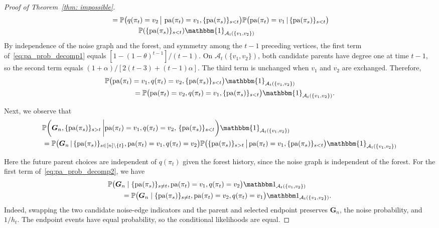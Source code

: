 \documentclass[twoside,11pt]{article}
\theoremstyle{remark}
\begin{document}
\begin{proof}[Proof of Theorem~\ref{thm: impossible}]
\begin{align}
&= \mathbb{P}\bigl( q(\pi_t) = v_2 \,\big|\, \operatorname{pa}(\pi_t) = v_1,  \{ \operatorname{pa}(\pi_s) \}_{s < t} \bigr) 
\mathbb{P}\bigl( \operatorname{pa}(\pi_t) = v_1 \,|\, \{ \operatorname{pa}(\pi_s) \}_{s < t} \bigr) \nonumber \\
&\qquad \qquad \mathbb{P}( \{\operatorname{pa}(\pi_s) \}_{s < t} ) \mathbbm{1}_{\mathcal{A}_t(\{v_1, v_2\})}\label{eq:pa_prob_decomp1}
\end{align}
By independence of the noise graph and the forest, and symmetry among the $t-1$ preceding vertices, the first term of~\eqref{eq:pa_prob_decomp1} equals $[1-(1-\theta)^{t-1}]/(t-1)$.
On $\mathcal A_t(\{v_1,v_2\})$, both candidate parents have degree one at time $t-1$, so the second term equals $(1+\alpha)/[2(t-3)+(t-1)\alpha]$.
The third term is unchanged when $v_1$ and $v_2$ are exchanged. Therefore,
\begin{align*}
&\mathbb{P}\bigl( \operatorname{pa}(\pi_t) = v_1, q(\pi_t) = v_2, \{ \operatorname{pa}(\pi_s) \}_{s < t} \bigr) \mathbbm{1}_{\mathcal{A}_t(\{v_1, v_2\})} \\
&\qquad \qquad =  
\mathbb{P}\bigl( \operatorname{pa}(\pi_t) = v_2, q(\pi_t) = v_1, \{ \operatorname{pa}(\pi_s) \}_{s < t} \bigr) \mathbbm{1}_{\mathcal{A}_t(\{v_1, v_2\})}.
\end{align*}

Next, we observe that 
\begingroup
\begin{align}
& \mathbb{P}\biggl(\bm{G}_n, \{\text{pa}(\pi_s)\}_{s>t} \,\bigg| \text{pa}(\pi_t) = v_1, q(\pi_t)=v_2,\, \{\text{pa}(\pi_s)\}_{s<t}\biggr)\mathbbm{1}_{\mathcal{A}_t(\{v_1, v_2\})} \nonumber \\
%
& = \mathbb{P}\bigl( \bm{G}_n \,|\, \{\operatorname{pa}(\pi_s)\}_{s \in [n] \backslash \{t\}}, \operatorname{pa}(\pi_t) = v_1, q(\pi_t)=v_2 \bigr) \mathbb{P}\bigl( \{\text{pa}(\pi_s)\}_{s>t} \,\big|\, \text{pa}(\pi_t) = v_1, \{\text{pa}(\pi_s)\}_{s<t}\bigr)\mathbbm{1}_{\mathcal{A}_t(\{v_1, v_2\})}
\label{eq:pa_prob_decomp2}
\end{align}
\endgroup


Here the future parent choices are independent of $q(\pi_t)$ given the forest history, since the noise graph is independent of the forest.
For the first term of~\eqref{eq:pa_prob_decomp2}, we have
%
\begin{equation*}
\begin{aligned}
&\mathbb P\bigl(\bm G_n\mid\{\operatorname{pa}(\pi_s)\}_{s\neq t},\operatorname{pa}(\pi_t)=v_1,q(\pi_t)=v_2\bigr)
\mathbbm1_{\mathcal A_t(\{v_1,v_2\})}\\
&\qquad=\mathbb P\bigl(\bm G_n\mid\{\operatorname{pa}(\pi_s)\}_{s\neq t},\operatorname{pa}(\pi_t)=v_2,q(\pi_t)=v_1\bigr)
\mathbbm1_{\mathcal A_t(\{v_1,v_2\})}.
\end{aligned}
\end{equation*}
%
Indeed, swapping the two candidate noise-edge indicators and the parent and selected endpoint preserves $\bm G_n$, the noise probability, and $1/h_t$. The endpoint events have equal probability, so the conditional likelihoods are equal.



\end{proof}
\end{document}
